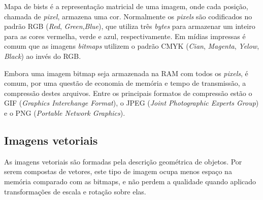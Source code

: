 Mapa de bists é a representação matricial de uma imagem, onde cada posição,
chamada de \textit{pixel}, armazena uma cor. Normalmente os \textit{pixels} são
codificados no padrão RGB (\textit{Red}, \textit{Green},\textit{Blue}), que
utiliza três \textit{bytes} para armazenar um inteiro para as cores vermelha,
verde e azul, respectivamente. Em mídias impressas é comum que as imagens
\textit{bitmaps} utilizem o padrão
CMYK (\textit{Cian}, \textit{Magenta}, \textit{Yelow}, \textit{Black}) ao invés
do RGB.

Embora uma imagem bitmap seja armazenada na RAM com todos os \textit{pixels}, é
comum, por uma questão de economia de memória e tempo de transmissão, a compressão
destes arquivos. Entre os principais formatos de compressão estão
o GIF (\textit{Graphics Interchange Format}), o JPEG
(\textit{Joint Photographic Experts Group}) e o PNG (\textit{Portable Network Graphics}).

\subsection{Imagens vetoriais}

As imagens vetoriais são formadas pela descrição geométrica de objetos.
Por serem compostas de vetores, este tipo de imagem ocupa menos espaço na
memória comparado com as bitmaps, e não perdem a qualidade quando
aplicado transformações de escala e rotação sobre elas.

